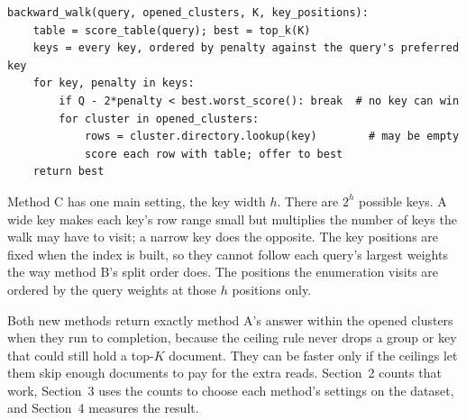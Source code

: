 \begin{lstlisting}
backward_walk(query, opened_clusters, K, key_positions):
    table = score_table(query); best = top_k(K)
    keys = every key, ordered by penalty against the query's preferred key
    for key, penalty in keys:
        if Q - 2*penalty < best.worst_score(): break  # no key can win
        for cluster in opened_clusters:
            rows = cluster.directory.lookup(key)        # may be empty
            score each row with table; offer to best
    return best
\end{lstlisting}

Method C has one main setting, the key width $h$. There are $2^h$ possible keys. A wide key
makes each key's row range small but multiplies the number of keys the walk may have to
visit; a narrow key does the opposite. The key positions are fixed when the index is built,
so they cannot follow each query's largest weights the way method B's split order does. The
positions the enumeration visits are ordered by the query weights at those $h$ positions only.

Both new methods return exactly method A's answer within the opened clusters when they run to
completion, because the ceiling rule never drops a group or key that could still hold a
top-$K$ document. They can be faster only if the ceilings let them skip enough documents to
pay for the extra reads. Section~2 counts that work, Section~3 uses the counts to choose each
method's settings on the dataset, and Section~4 measures the result.
